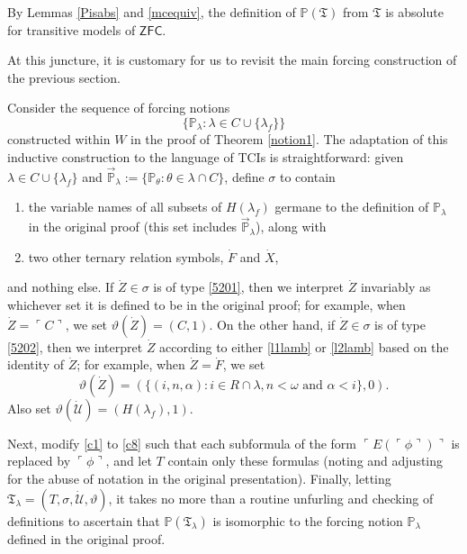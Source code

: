 \documentclass[12pt]{article}
\numberwithin{equation}{section}
\begin{document}
By Lemmas \ref{Pisabs} and \ref{mcequiv}, the definition of $\mathbb{P}(\mathfrak{T})$ from $\mathfrak{T}$ is absolute for transitive models of $\mathsf{ZFC}$.

At this juncture, it is customary for us to revisit the main forcing construction of the previous section.

\begin{rem}\label{rem520}
Consider the sequence of forcing notions $$\{\mathbb{P}_{\lambda} : \lambda \in C \cup \{\lambda_f\}\}$$ constructed within $W$ in the proof of Theorem \ref{notion1}. The adaptation of this inductive construction to the language of TCIs is straightforward: given $\lambda \in C \cup \{\lambda_f\}$ and $\Vec{\mathbb{P}}_{\lambda} := \{\mathbb{P}_{\theta} : \theta \in \lambda \cap C\}$, define $\sigma$ to contain
\begin{enumerate}[label=(\Alph*)]
    \item\label{5201} the variable names of all subsets of $H(\lambda_f)$ germane to the definition of $\mathbb{P}_{\lambda}$ in the original proof (this set includes $\Vec{\mathbb{P}}_{\lambda}$), along with
    \item\label{5202} two other ternary relation symbols, $\dot{F}$ and $\dot{X}$,
\end{enumerate}
and nothing else. If $\dot{Z} \in \sigma$ is of type \ref{5201}, then we interpret $\dot{Z}$ invariably as whichever set it is defined to be in the original proof; for example, when $\dot{Z} = \ulcorner C \urcorner$, we set $\vartheta (\dot{Z}) = (C, 1)$. On the other hand, if $\dot{Z} \in \sigma$ is of type \ref{5202}, then we interpret $\dot{Z}$ according to either \ref{l1lamb} or \ref{l2lamb} based on the identity of $\dot{Z}$; for example, when $\dot{Z} = \dot{F}$,  we set $$\vartheta (\dot{Z}) = (\{(i, n, \alpha) : i \in R \cap \lambda, n < \omega \text{ and } \alpha < i\}, 0).$$ Also set $\vartheta (\dot{\mathcal{U}}) = (H(\lambda_f), 1)$. 

Next, modify \ref{c1} to \ref{c8} such that each subformula of the form $\ulcorner E(\ulcorner \phi \urcorner) \urcorner$ is replaced by $\ulcorner \phi \urcorner$, and let $T$ contain only these formulas (noting and adjusting for the abuse of notation in the original presentation). Finally, letting $\mathfrak{T}_{\lambda} = (T, \sigma, \dot{\mathcal{U}}, \vartheta)$, it takes no more than a routine unfurling and checking of definitions to ascertain that $\mathbb{P}(\mathfrak{T}_{\lambda})$ is isomorphic to the forcing notion $\mathbb{P}_{\lambda}$ defined in the original proof.
\end{rem}
\end{document}
